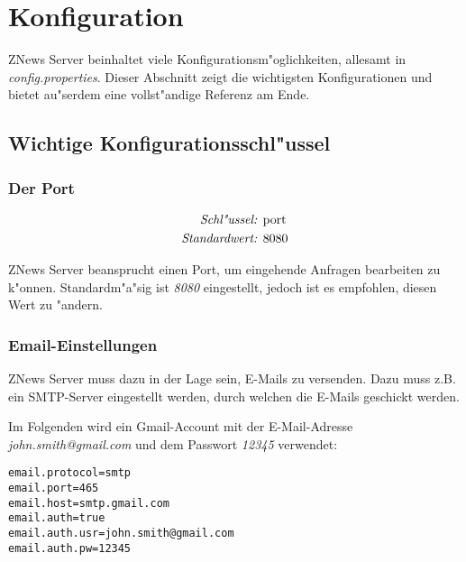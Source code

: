 \pagebreak
\section{Konfiguration}%
\label{sec:config}

ZNews Server beinhaltet viele Konfigurationsm"oglichkeiten,
allesamt in \emph{config.properties}.
Dieser Abschnitt zeigt die wichtigsten Konfigurationen
und bietet au"serdem eine vollst"andige Referenz am Ende.

\subsection{Wichtige Konfigurationsschl"ussel}

\subsubsection{Der Port} \label{sec:config:port}

\begin{align*}
    \emph{Schl"ussel: } & \lstinline{port}\\
    \emph{Standardwert: } & \lstinline{8080}
\end{align*}

ZNews Server beansprucht einen Port, um eingehende
Anfragen bearbeiten zu k"onnen. Standardm"a"sig ist
\emph{8080} eingestellt, jedoch ist es empfohlen,
diesen Wert zu "andern.

\subsubsection{Email-Einstellungen}

ZNews Server muss dazu in der Lage sein, E-Mails
zu versenden. Dazu muss z.B. ein SMTP-Server eingestellt
werden, durch welchen die E-Mails geschickt werden.

Im Folgenden wird ein Gmail-Account mit der
E-Mail-Adresse \emph{john.smith@gmail.com} und
dem Passwort \emph{12345} verwendet:

\begin{lstlisting}[]%@formatter:off
email.protocol=smtp
email.port=465
email.host=smtp.gmail.com
email.auth=true
email.auth.usr=john.smith@gmail.com
email.auth.pw=12345
\end{lstlisting}%

